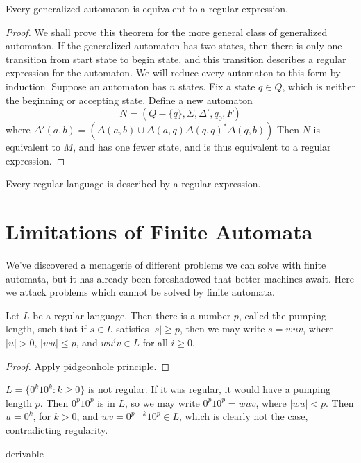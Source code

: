 \begin{theorem}
    Every generalized automaton is equivalent to a regular expression.
\end{theorem}
\begin{proof}
    We shall prove this theorem for the more general class of generalized automaton. If the generalized automaton has two states, then there is only one transition from start state to begin state, and this transition describes a regular expression for the automaton. We will reduce every automaton to this form by induction. Suppose an automaton has $n$ states. Fix a state $q \in Q$, which is neither the beginning or accepting state. Define a new automaton
    \[ N = (Q - \{ q \}, \Sigma, \Delta', q_0, F) \]
    where $\Delta'(a,b) = (\Delta(a,b) \cup \Delta(a,q) \Delta(q,q)^* \Delta(q,b))$
    Then $N$ is equivalent to $M$, and has one fewer state, and is thus equivalent to a regular expression.
\end{proof}

\begin{corollary}
    Every regular language is described by a regular expression.
\end{corollary}


\section{Limitations of Finite Automata}

We've discovered a menagerie of different problems we can solve with finite automata, but it has already been foreshadowed that better machines await. Here we attack problems which cannot be solved by finite automata.

\begin{theorem}
    Let $L$ be a regular language. Then there is a number $p$, called the pumping length, such that if $s \in L$ satisfies $|s| \geq p$, then we may write $s = wuv$, where $|u| > 0$, $|wu| \leq p$, and $wu^iv \in L$ for all $i \geq 0$.
\end{theorem}
\begin{proof}
    Apply pidgeonhole principle.
\end{proof}

\begin{example}
    $L = \{ 0^k10^k : k \geq 0 \}$ is not regular. If it was regular, it would have a pumping length $p$. Then $0^p10^p$ is in $L$, so we may write $0^p10^p = wuv$, where $|wu| < p$. Then $u = 0^k$, for $k > 0$, and $wv = 0^{p-k}10^p \in L$, which is clearly not the case, contradicting regularity.
\end{example}
 derivable




